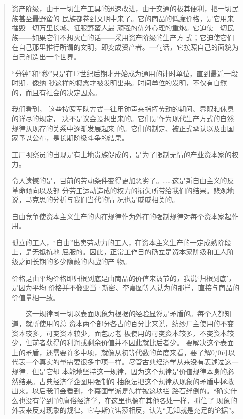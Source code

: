 \begin{quotation}
资产阶级，由于一切生产工具的迅速改进，由于交通的极其便利，把一切民族甚至最野蛮的
民族都卷到文明中来了。它的商品的低廉价格，是它用来摧毁一切万里长城、征服野蛮人最
顽强的仇外心理的重炮。它迫使一切民族——如果它们不想灭亡的话——采用资产阶级的生产方
式；它迫使它们在自己那里推行所谓的文明，即变成资产者。一句话，它按照自己的面貌为
自己创造出一个世界。


“分钟”和“秒”只是在17世纪后期才开始成为通用的计时单位，直到最近一段时期，像纳
秒这样的概念才被发明出来。时间单位的发明，不仅有自然的，而且有社会的决定因素。

我们看到， 这些按照军队方式一律用钟声来指挥劳动的期间、界限和休息的详尽的规定，
决不是议会设想出来的。它们是作为现代生产方式的自然规律从现存的关系中逐渐发展起来
的。它们的制定、被正式承认以及由国家予以公布，是长期阶级斗争的结果。

工厂视察员的出现是有土地贵族促成的，是为了限制无情的产业资本家的权力。

令人遗憾的是，目前的劳动条件变得更加恶劣了。……这是新自由主义的反革命倾向以及部
分劳工运动造成的权力的损失所带给我们的结果。悲观地说，马克思的分析与我们当代的情
况也是戚戚相关的。

自由竞争使资本主义生产的内在规律作为外在的强制规律对每个资本家起作用。


孤立的工人，“自由”出卖劳动力的工人，在资本主义生产的一定成熟阶段上，是无抵抗地
屈服的。因此，正常工作日的确立是资本家阶级和工人阶级之间长期的多少隐蔽的内战的产
物。

  价格是由平均价格即归根到底是由商品的价值来调节的，我说‘归根到底’，是因为平均
价格并不像亚当·斯密、李嘉图等人认为的那样，直接与商品的价值量相一致。

　　这一规律同一切以表面现象为根据的经验显然是矛盾的。每个人都知道，就所使用的总
资本两个部分各占的百分比来说，纺纱厂主使用的不变资本较多，可变资本较少，面包房老
板使用的可变资本较多，不变资本较少，但前者获得的利润或剩余价值并不因此就比后者少。
要解决这个表面上的矛盾，还需要许多中项，就像从初等代数的角度来看，要了解0/0可以
代表一个真实的量需要很多中项一样。尽管古典经济学从来没有表述过这一规律，但是它却
本能地坚持这一规律，因为这个规律是价值规律本身的必然结果。古典经济学企图用强制的
抽象法把这个规律从现象的矛盾中拯救出来。以后我们会看到，李嘉图学派是怎样被这块拦
路石绊倒的。“确实什么也没有学到”的庸俗经济学，在这里也像在其他各处一样，抓住了
现象的外表来反对现象的规律。它与斯宾诺莎相反，认为“无知就是充足的论据”。


\end{quotation}
